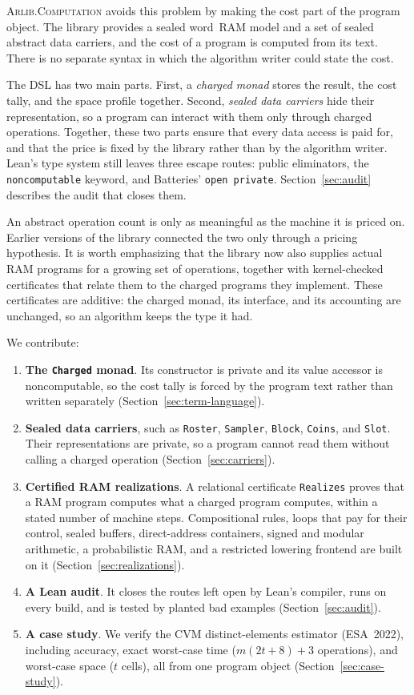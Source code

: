 \documentclass[acmsmall,nonacm]{acmart}
\begin{document}
\textsc{Arlib.Computation} avoids this problem by making the cost part of the program object.
The library provides a sealed word~RAM model and a set of sealed abstract data carriers, and the cost of a program is computed from its text.
There is no separate syntax in which the algorithm writer could state the cost.

The DSL has two main parts.
First, a \emph{charged monad} stores the result, the cost tally, and the space profile together.
Second, \emph{sealed data carriers} hide their representation, so a program can interact with them only through charged operations.
Together, these two parts ensure that every data access is paid for, and that the price is fixed by the library rather than by the algorithm writer.
Lean's type system still leaves three escape routes: public eliminators, the \lstinline{noncomputable} keyword, and Batteries' \lstinline{open private}.
Section~\ref{sec:audit} describes the audit that closes them.

An abstract operation count is only as meaningful as the machine it is priced on.
Earlier versions of the library connected the two only through a pricing hypothesis.
It is worth emphasizing that the library now also supplies actual RAM programs for a growing set of operations, together with kernel-checked certificates that relate them to the charged programs they implement.
These certificates are additive: the charged monad, its interface, and its accounting are unchanged, so an algorithm keeps the type it had.

We contribute:
\begin{enumerate}
  \item \textbf{The \lstinline{Charged} monad}. Its constructor is private and its value accessor is noncomputable, so the cost tally is forced by the program text rather than written separately (Section~\ref{sec:term-language}).
  \item \textbf{Sealed data carriers}, such as \lstinline{Roster}, \lstinline{Sampler}, \lstinline{Block}, \lstinline{Coins}, and \lstinline{Slot}. Their representations are private, so a program cannot read them without calling a charged operation (Section~\ref{sec:carriers}).
  \item \textbf{Certified RAM realizations}. A relational certificate \lstinline{Realizes} proves that a RAM program computes what a charged program computes, within a stated number of machine steps. Compositional rules, loops that pay for their control, sealed buffers, direct-address containers, signed and modular arithmetic, a probabilistic RAM, and a restricted lowering frontend are built on it (Section~\ref{sec:realizations}).
  \item \textbf{A Lean audit}. It closes the routes left open by Lean's compiler, runs on every build, and is tested by planted bad examples (Section~\ref{sec:audit}).
  \item \textbf{A case study}. We verify the CVM distinct-elements estimator (ESA~2022), including accuracy, exact worst-case time ($m(2t + 8) + 3$ operations), and worst-case space ($t$ cells), all from one program object (Section~\ref{sec:case-study}).
\end{enumerate}
\end{document}
